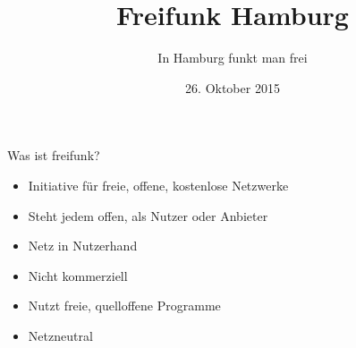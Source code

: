\documentclass[t]{beamer}
\title{Freifunk Hamburg}
\author{In Hamburg funkt man frei}
\date{26. Oktober 2015}
\begin{document}
  \maketitle
  
  \begin{frame}{Was ist freifunk?}
    \begin{itemize}
      \item Initiative für freie, offene, kostenlose Netzwerke
      \item Steht jedem offen, als Nutzer oder Anbieter
      \item Netz in Nutzerhand
      \item Nicht kommerziell
      \item Nutzt freie, quelloffene Programme
      \item Netzneutral
    \end{itemize}
  \end{frame}
  
\end{document}
